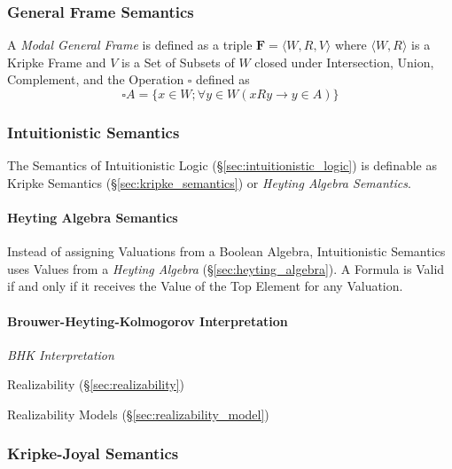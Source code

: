 \subsubsection{General Frame Semantics}
\label{sec:general_frame_semantics}

A \emph{Modal General Frame} is defined as a triple $\mathbf{F} =
\langle W,R,V \rangle$ where $\langle W,R \rangle$ is a Kripke Frame
and $V$ is a Set of Subsets of $W$ closed under Intersection, Union,
Complement, and the Operation $\square$ defined as
\[
    \square A = \{x \in W; \forall y \in W ( x R y \rightarrow y \in A ) \}
\]



\subsubsection{Intuitionistic Semantics}
\label{sec:intuitionistic_semantics}

The Semantics of Intuitionistic Logic
(\S\ref{sec:intuitionistic_logic}) is definable as Kripke Semantics
(\S\ref{sec:kripke_semantics}) or \emph{Heyting Algebra Semantics}.



\paragraph{Heyting Algebra Semantics}\label{sec:heyting_semantics}\hfill

Instead of assigning Valuations from a Boolean Algebra, Intuitionistic
Semantics uses Values from a \emph{Heyting Algebra}
(\S\ref{sec:heyting_algebra}). A Formula is Valid if and only if it
receives the Value of the Top Element for any Valuation.



\paragraph{Brouwer-Heyting-Kolmogorov Interpretation}\hfill
\label{sec:brouwer_heyting_kolmogorov}

\emph{BHK Interpretation}

Realizability (\S\ref{sec:realizability})

Realizability Models (\S\ref{sec:realizability_model})



\subsubsection{Kripke-Joyal Semantics}\label{sec:kripke_joyal}

